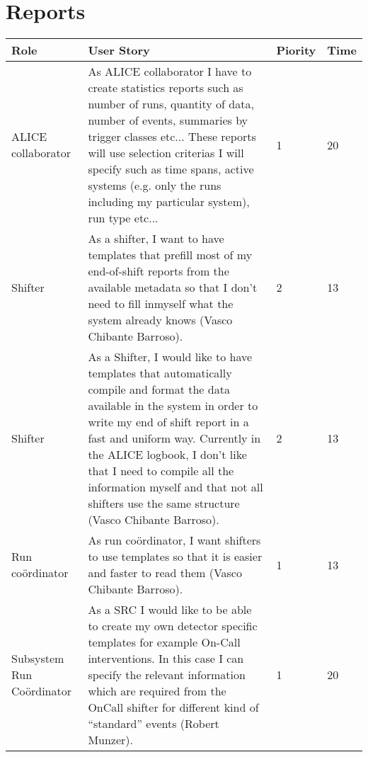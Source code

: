 \section{Reports}
\begin{longtable}{ | p{2cm} | p{8cm} | p{1.5cm} | l |}
\hline
Role & User Story & Piority & Time \\ \hline
ALICE collaborator &  As ALICE collaborator I have to create statistics reports such as number of runs, quantity of data, number of events, summaries by trigger
classes etc... These reports will use selection criterias I will specify
such as time spans, active systems (e.g. only the runs including my
particular system), run type etc... & 1 & 20 \\ \hline
Shifter &  As a shifter, I want to have templates that prefill most of my end-of-shift reports from the available metadata so that I don’t need to fill inmyself what the system already knows (Vasco Chibante Barroso). & 2 & 13 \\ \hline
Shifter &  As a Shifter, I would like to have templates that automatically compile and format the data available in the system in order to write my end of shift report in a fast and uniform way. Currently in the ALICE logbook, I don’t like that I need to compile all the information myself and that
not all shifters use the same structure (Vasco Chibante Barroso). & 2 & 13 \\ \hline
Run coördinator &  As run coördinator, I want shifters to use templates so that it is easier
and faster to read them (Vasco Chibante Barroso). & 1 & 13 \\ \hline
Subsystem Run Coördinator & As a SRC I would like to be able to create my own detector specific templates for example On-Call interventions. In this case I can specify the relevant information which are required from the OnCall shifter for different kind of “standard” events (Robert Munzer). & 1 & 20 \\ \hline
\end{longtable}
\newpage
